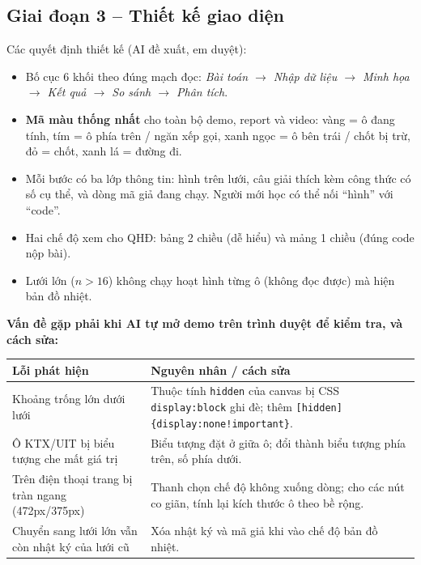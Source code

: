 \documentclass[12pt,a4paper]{report}
\begin{document}
\subsection*{Giai đoạn 3 -- Thiết kế giao diện}
Các quyết định thiết kế (AI đề xuất, em duyệt):
\begin{itemize}
  \item Bố cục 6 khối theo đúng mạch đọc: \emph{Bài toán $\to$ Nhập dữ liệu $\to$ Minh họa $\to$ Kết quả $\to$ So sánh $\to$ Phân tích}.
  \item \textbf{Mã màu thống nhất} cho toàn bộ demo, report và video: vàng = ô đang tính, tím = ô phía trên / ngăn xếp gọi, xanh ngọc = ô bên trái / chốt bị trừ, đỏ = chốt, xanh lá = đường đi.
  \item Mỗi bước có ba lớp thông tin: hình trên lưới, câu giải thích kèm công thức có số cụ thể, và dòng mã giả đang chạy. Người mới học có thể nối ``hình'' với ``code''.
  \item Hai chế độ xem cho QHĐ: bảng 2 chiều (dễ hiểu) và mảng 1 chiều (đúng code nộp bài).
  \item Lưới lớn ($n>16$) không chạy hoạt hình từng ô (không đọc được) mà hiện bản đồ nhiệt.
\end{itemize}
\textbf{Vấn đề gặp phải khi AI tự mở demo trên trình duyệt để kiểm tra, và cách sửa:}
\begin{center}
\begin{tabular}{p{6.6cm} p{7.6cm}}
\toprule
\textbf{Lỗi phát hiện} & \textbf{Nguyên nhân / cách sửa}\\\midrule
Khoảng trống lớn dưới lưới & Thuộc tính \texttt{hidden} của canvas bị CSS \texttt{display:block} ghi đè; thêm \texttt{[hidden]\{display:none!important\}}.\\
Ô KTX/UIT bị biểu tượng che mất giá trị & Biểu tượng đặt ở giữa ô; đổi thành biểu tượng phía trên, số phía dưới.\\
Trên điện thoại trang bị tràn ngang (472px/375px) & Thanh chọn chế độ không xuống dòng; cho các nút co giãn, tính lại kích thước ô theo bề rộng.\\
Chuyển sang lưới lớn vẫn còn nhật ký của lưới cũ & Xóa nhật ký và mã giả khi vào chế độ bản đồ nhiệt.\\
\bottomrule
\end{tabular}
\end{center}
\end{document}

